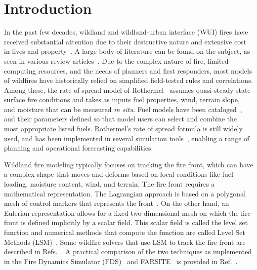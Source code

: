 \documentclass[journal,article,atmosphere,submit,moreauthors,pdftex]{Definitions_Review_Process/mdpi}
\begin{document}
\section{Introduction}

In the past few decades, wildland and wildland-urban interface (WUI) fires have received substantial attention due to their destructive nature and extensive cost in lives and property~\cite{thomas_2017,mcdermott_2019,richards_2020}. A large body of literature can be found on the subject, as seen in various review articles~\cite{Papadopoulos_2011,Bakhshaii_2019,mcdermott_2019}. Due to the complex nature of fire, limited computing resources, and the needs of planners and first responders, most models of wildfires have historically relied on simplified field-tested rules and correlations. Among these, the rate of spread model of Rothermel~\cite{Rothermel:1972} assumes quasi-steady state surface fire conditions and takes as inputs fuel properties, wind, terrain slope, and moisture that can be measured {\em in situ}. Fuel models have been cataloged~\cite{Anderson:1982}, and their parameters defined so that model users can select and combine the most appropriate listed fuels. Rothermel's rate of spread formula is still widely used, and has been implemented in several simulation tools~\cite{Finney:FARSITE,Bova:IJWF2015,FDS_Users_Guide,Coen:2,Coen:2015,LAUTENBERGER_2013,Coen:2013,Mandel:2009,Mandel:2011,Mandel:2014,Kochanski:2016}, enabling a range of planning and operational forecasting capabilities.

Wildland fire modeling typically focuses on tracking the fire front, which can have a complex shape that moves and deforms based on local conditions like fuel loading, moisture content, wind, and terrain. The fire front requires a mathematical representation. The Lagrangian approach is based on a polygonal mesh of control markers that represents the front~\cite{Finney:FARSITE,Bova:IJWF2015}. On the other hand, an Eulerian representation allows for a fixed two-dimensional mesh on which the fire front is defined implicitly by a scalar field. This scalar field is called the level set function and numerical methods that compute the function are called Level Set Methods (LSM)~\cite{Sethian:1999,Osher:2006}. Some wildfire solvers that use LSM to track the fire front are described in Refs.~\cite{coen_2013,Bova:IJWF2015,FDS_Users_Guide,LAUTENBERGER_2013}. A practical comparison of the two techniques as implemented in the Fire Dynamics Simulator (FDS)~\cite{Mell:IJWF2007} and FARSITE~\cite{Finney:FARSITE} is provided in Ref.~\cite{Bova:IJWF2015}.
\end{document}
